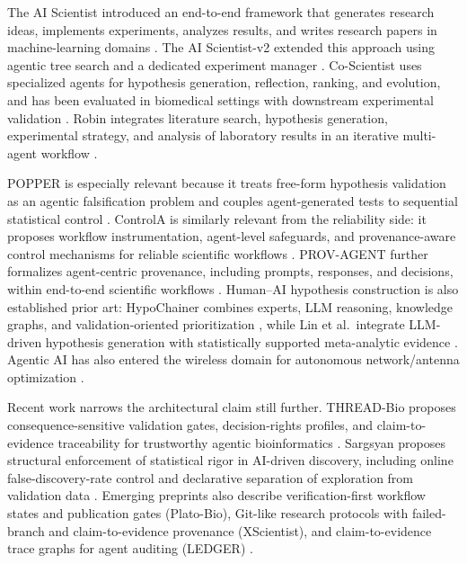 \documentclass{ieeeaccess}
\begin{document}
The AI Scientist introduced an end-to-end framework that generates research ideas, implements experiments, analyzes results, and writes research papers in machine-learning domains \cite{AI-SCIENTIST-2024}. The AI Scientist-v2 extended this approach using agentic tree search and a dedicated experiment manager \cite{AI-SCIENTIST-V2-2025}. Co-Scientist uses specialized agents for hypothesis generation, reflection, ranking, and evolution, and has been evaluated in biomedical settings with downstream experimental validation \cite{CO-SCIENTIST-2026}. Robin integrates literature search, hypothesis generation, experimental strategy, and analysis of laboratory results in an iterative multi-agent workflow \cite{ROBIN-2026}.

POPPER is especially relevant because it treats free-form hypothesis validation as an agentic falsification problem and couples agent-generated tests to sequential statistical control \cite{POPPER-2025}. ControlA is similarly relevant from the reliability side: it proposes workflow instrumentation, agent-level safeguards, and provenance-aware control mechanisms for reliable scientific workflows \cite{CONTROLA-2025}. PROV-AGENT further formalizes agent-centric provenance, including prompts, responses, and decisions, within end-to-end scientific workflows \cite{PROV-AGENT-2025}. Human--AI hypothesis construction is also established prior art: HypoChainer combines experts, LLM reasoning, knowledge graphs, and validation-oriented prioritization \cite{HYPOCHAINER-2026}, while Lin et al.~integrate LLM-driven hypothesis generation with statistically supported meta-analytic evidence \cite{LLM-META-2025}. Agentic AI has also entered the wireless domain for autonomous network/antenna optimization \cite{AGENTIC-WIRELESS-2026}.

Recent work narrows the architectural claim still further. THREAD-Bio proposes consequence-sensitive validation gates, decision-rights profiles, and claim-to-evidence traceability for trustworthy agentic bioinformatics \cite{THREAD-BIO-2026}. Sargsyan proposes structural enforcement of statistical rigor in AI-driven discovery, including online false-discovery-rate control and declarative separation of exploration from validation data \cite{SARGSYAN-RIGOR-2025}. Emerging preprints also describe verification-first workflow states and publication gates (Plato-Bio), Git-like research protocols with failed-branch and claim-to-evidence provenance (XScientist), and claim-to-evidence trace graphs for agent auditing (LEDGER) \cite{PLATO-BIO-2026,XSCIENTIST-2026,LEDGER-2026}.
\end{document}
